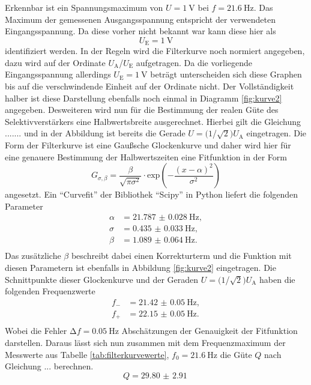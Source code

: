 Erkennbar ist ein Spannungsmaximum von $U = \SI{1}{\volt}$ bei $f = \SI{21.6}{\hertz}$. Das Maximum der gemessenen Ausgangsspannung entspricht der verwendeten Eingangsspannung. Da diese vorher nicht bekannt war kann diese hier als 
\begin{equation*}
U_{\text{E}} = \SI{1}{\volt}
\end{equation*}
identifiziert werden. In der Regeln wird die Filterkurve noch normiert angegeben, dazu wird auf der Ordinate $U_{\text{A}}$/$U_{\text{E}}$ aufgetragen. Da die vorliegende Eingangsspannung allerdings $U_{\text{E}} = \SI{1}{\volt}$ beträgt 
unterscheiden sich diese Graphen bis auf die verschwindende Einheit auf der Ordinate nicht. 
Der Vollständigkeit halber ist diese Darstellung ebenfalls noch einmal in Diagramm \ref{fig:kurve2} angegeben.
Desweiteren wird nun für die Bestimmung der realen Güte des Selektivverstärkers eine Halbwertsbreite ausgerechnet. Hierbei gilt die Gleichung .......
und in der Abbildung ist bereits die Gerade $U = (1$/$\sqrt{2}) U_{\text{A}}$ eingetragen. Die Form der Filterkurve ist eine Gaußsche Glockenkurve und daher wird hier für eine
genauere Bestimmung der Halbwertszeiten eine Fitfunktion in der Form \cite{gauss}
\begin{equation}
G_{\sigma, \beta} =  \frac{\beta}{\sqrt{\pi \sigma^2}} \cdot \text{exp}\left( -\frac{(x- \alpha)^2}{\sigma^2}\right)
\end{equation}
angesetzt.
Ein \enquote{Curvefit} der Bibliothek \enquote{Scipy} \cite{scipy} in Python liefert die folgenden Parameter
\begin{align*}
\alpha &= \SI{21.787(28)}{\hertz},\\ 
\sigma &= \SI{0.435(33)}{\hertz},\\
\beta  &= \SI{1.089(64)}{\hertz}.\\
\end{align*}
Das zusätzliche $\beta$ beschreibt dabei einen Korrekturterm und die Funktion mit diesen Parametern ist ebenfalls in Abbildung \ref{fig:kurve2} eingetragen. Die Schnittpunkte dieser Glockenkurve und der Geraden $U = (1$/$\sqrt{2}) U_{\text{A}}$ haben die folgenden Frequenzwerte
\begin{align*}
f_{-} &= \SI{21.42(5)}{\hertz},\\
f_{+} &= \SI{22.15(5)}{\hertz}.\\
\end{align*}
Wobei die Fehler $\increment f = \SI{0.05}{\hertz}$ Abschätzungen der Genauigkeit der Fitfunktion darstellen.
Daraus lässt sich nun zusammen mit dem Frequenzmaximum der Messwerte aus Tabelle \ref{tab:filterkurvewerte}, $f_{0} = \SI{21.6}{\hertz}$ die Güte $Q$ nach Gleichung ... berechnen.
\begin{equation}
Q = \SI{29.80(291)}{}
\end{equation}

